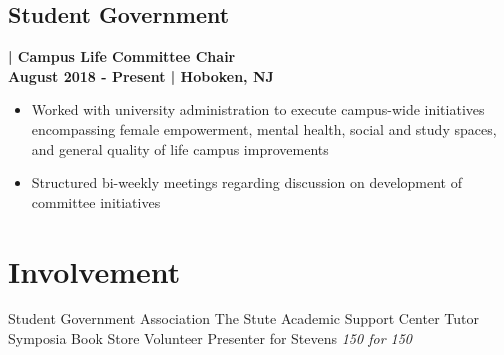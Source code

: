 \documentclass[a4paper, 11pt]{article}
\newenvironment{tightemize}{
\vspace{-\topsep}\begin{itemize}[leftmargin=1em]\itemsep1pt \parskip0pt \parsep0pt}
{\end{itemize}\vspace{-\topsep}}
\begin{document}
\begin{minipage}[h]{0.63\textwidth}
\subsection{Student Government}\textbf{\textcolor{location}{| Campus Life Committee Chair}}\\
\hspace{-6pt}\vspace{0.8em}\textbf{\textcolor{location}{August 2018 - Present | Hoboken, NJ}}
\vspace{-0.5em}
\begin{tightemize}
\item{\textcolor{location}{Worked with university administration to execute campus-wide initiatives encompassing female empowerment, mental health, social and study spaces, and general quality of life campus improvements}}
\item{\textcolor{location}{Structured bi-weekly meetings regarding discussion on development of committee initiatives}}
\end{tightemize}
\vspace{-1em}
\section{Involvement}
\textcolor{location}{
Student Government Association \textbullet{}
The Stute \textbullet{}
Academic Support Center Tutor \textbullet{}
Symposia Book Store Volunteer \textbullet{}
Presenter for Stevens \textit{150 for 150}}
\end{minipage}
\end{document}

